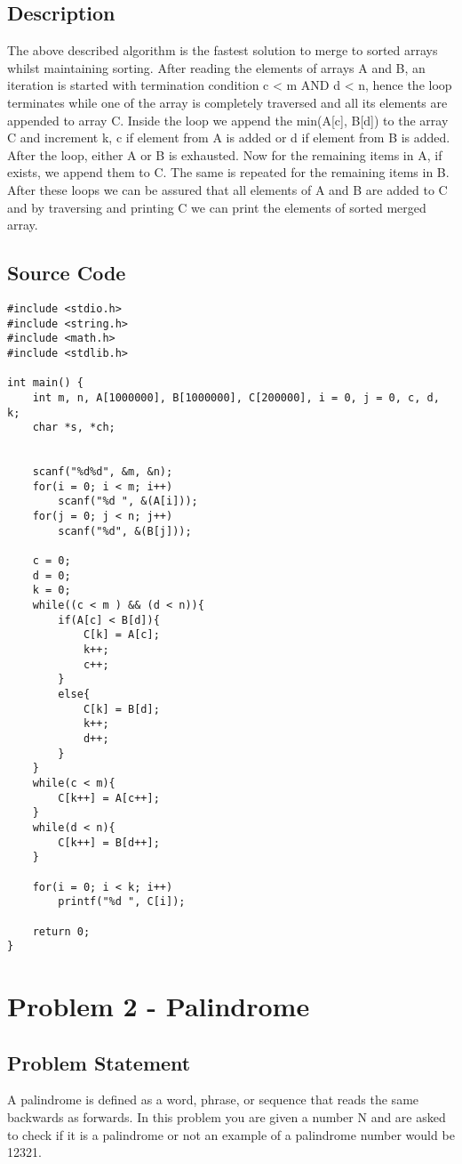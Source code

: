 \documentclass{article}
\begin{document}
\subsection{Description}
The above described algorithm is the fastest solution to merge to sorted arrays whilst maintaining sorting. After reading the elements of arrays A and B, an iteration is started with termination condition c < m AND d < n, hence the loop terminates while one of the array is completely traversed and all its elements are appended to array C. Inside the loop we append the min(A[c], B[d]) to the array C and increment k, c if element from A is added or d if element from B is added.\newline
After the loop, either A or B is exhausted. Now for the remaining items in A, if exists, we append them to C. The same is repeated for the remaining items in B.\newline
After these loops we can be assured that all elements of A and B are added to C and by traversing and printing C we can print the elements of sorted merged array.

\subsection{Source Code}
\begin{verbatim}
#include <stdio.h>
#include <string.h>
#include <math.h>
#include <stdlib.h>

int main() {
    int m, n, A[1000000], B[1000000], C[200000], i = 0, j = 0, c, d, k;
    char *s, *ch;


    scanf("%d%d", &m, &n);
    for(i = 0; i < m; i++)
        scanf("%d ", &(A[i]));
    for(j = 0; j < n; j++)
        scanf("%d", &(B[j]));

    c = 0;
    d = 0;
    k = 0;
    while((c < m ) && (d < n)){
        if(A[c] < B[d]){
            C[k] = A[c];
            k++;
            c++;
        }
        else{
            C[k] = B[d];
            k++;
            d++;
        }
    }
    while(c < m){
        C[k++] = A[c++];
    }
    while(d < n){
        C[k++] = B[d++];
    }

    for(i = 0; i < k; i++)
        printf("%d ", C[i]);

    return 0;
}
\end{verbatim}
\newpage
\section{Problem 2 - Palindrome}
\subsection{Problem Statement}
A palindrome is defined as a word, phrase, or sequence that reads the same backwards as forwards. In this problem you are given a number N and are asked to check if it is a palindrome or not an example of a palindrome number would be 12321.
\end{document}
